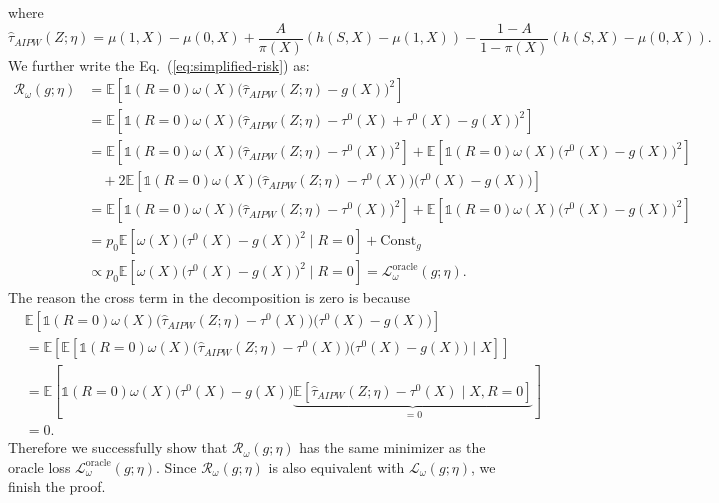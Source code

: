 \documentclass{article}
\theoremstyle{plain}
\theoremstyle{definition}
\theoremstyle{remark}
\newcommand{\E}{\mathbb{E}}                %
\newcommand{\1}{\mathds{1}}                %
\begin{document}
where 
\begin{equation}
    \hat{\tau}_{AIPW}(Z;\eta) = \mu(1,X) - \mu(0,X) + \frac{A}{\pi(X)}(h(S,X) - \mu(1,X)) - \frac{1-A}{1-\pi(X)}(h(S,X) - \mu(0,X)).
\end{equation}
%
We further write the Eq.~(\ref{eq:simplified-risk}) as:
\begin{align}
    \mathcal{R}_\omega(g;\eta) &=\E\left[\1(R=0) \omega(X) \big(\hat{\tau}_{AIPW}(Z;\eta) -g(X) \big)^2\right] \\
    &= \E\left[\1(R=0) \omega(X) \big(\hat{\tau}_{AIPW}(Z;\eta)- \tau^0(X) + \tau^0(X) - g(X) \big)^2\right] \\
    &= \E\left[\1(R=0) \omega(X) \bigl(\hat{\tau}_{AIPW}(Z;\eta)- \tau^0(X)\bigr)^2\right] + \E\left[\1(R=0) \omega(X) \bigl(\tau^0(X) - g(X) \bigr)^2\right] \nonumber \\
    &\quad + 2\E\left[\1(R=0) \omega(X) \bigl(\hat{\tau}_{AIPW}(Z;\eta)- \tau^0(X)\bigr)\bigl(\tau^0(X) - g(X) \bigr)\right] \\
    &= \E\left[\1(R=0) \omega(X) \bigl(\hat{\tau}_{AIPW}(Z;\eta)- \tau^0(X)\bigr)^2\right] +  \E\left[\1(R=0) \omega(X) \bigl(\tau^0(X) - g(X)\bigr)^2\right] \\
    &= p_0 \E\left[\omega(X)\bigl(\tau^0(X) - g(X)\bigr)^2 \mid R=0\right] + \text{Const}_g \\
    &\propto p_0 \E\left[\omega(X)\bigl(\tau^0(X) - g(X)\bigr)^2 \mid R=0\right] = \mathcal{L}^{\text{oracle}}_\omega(g;\eta).
\end{align}
The reason the cross term in the decomposition is zero is because
\begin{align}
    &\E\left[\1(R=0) \omega(X) \bigl(\hat{\tau}_{AIPW}(Z;\eta)- \tau^0(X)\bigr)\bigl(\tau^0(X) - g(X) \bigr)\right] \nonumber \\
    &= \E\left[ \E\left[ \1(R=0) \omega(X) \bigl(\hat{\tau}_{AIPW}(Z;\eta)- \tau^0(X)\bigr)\bigl(\tau^0(X) - g(X) \bigr) \mid X \right] \right] \\
    &= \E\left[ \1(R=0) \omega(X) \bigl(\tau^0(X) - g(X) \bigr) \underbrace{\E\left[ \hat{\tau}_{AIPW}(Z;\eta)- \tau^0(X) \mid X, R=0 \right]}_{=0} \right] \\
    &= 0.
\end{align}
Therefore we successfully show that $\mathcal{R}_\omega(g;\eta)$ has the same minimizer as the oracle loss $\mathcal{L}^{\text{oracle}}_\omega(g;\eta)$. Since $\mathcal{R}_\omega(g;\eta)$ is also equivalent with $\mathcal{L}_\omega(g;\eta)$, we finish the proof.
\end{document}
